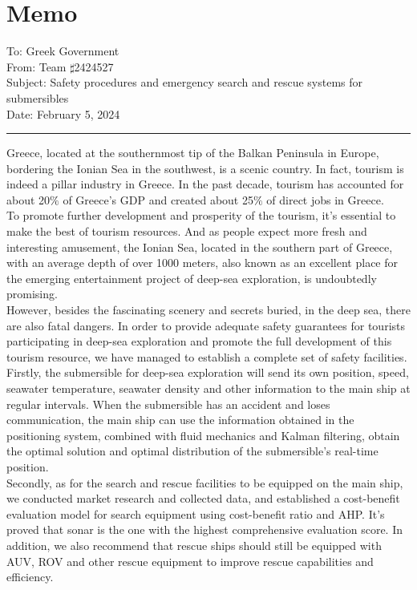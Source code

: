 \documentclass[12pt]{article}  %
\begin{document}
\clearpage 
\appendix %

\section{Memo}
\indent To: Greek Government\\
\indent From: Team $\sharp$2424527\\
\indent Subject: Safety procedures and emergency search and rescue systems for submersibles\\
\indent Date: February 5, 2024\\
\hrule
Greece, located at the southernmost tip of the Balkan Peninsula in Europe, bordering the Ionian Sea in the southwest, is a scenic country. In fact, tourism is indeed a pillar industry in Greece. In the past decade, tourism has accounted for about 20$\%$ of Greece's GDP and created about 25$\%$  of direct jobs in Greece.\\

To promote further development and prosperity of the tourism, it’s essential to make the best of tourism resources. And as people expect more fresh and interesting amusement, the Ionian Sea, located in the southern part of Greece, with an average depth of over 1000 meters, also known as an excellent place for the emerging entertainment project of deep-sea exploration, is undoubtedly promising.\\

However, besides the fascinating scenery and secrets buried, in the deep sea, there are also fatal dangers. In order to provide adequate safety guarantees for tourists participating in deep-sea exploration and promote the full development of this tourism resource, we have managed to establish a complete set of safety facilities.\\

Firstly, the submersible for deep-sea exploration will send its own position, speed, seawater temperature, seawater density and other information to the main ship at regular intervals. When the submersible has an accident and loses communication, the main ship can use the information obtained in the positioning system, combined with fluid mechanics and Kalman filtering, obtain the optimal solution and optimal distribution of the submersible's real-time position.\\

Secondly, as for the search and rescue facilities to be equipped on the main ship, we conducted market research and collected data, and established a cost-benefit evaluation model for search equipment using cost-benefit ratio and AHP. It’s proved that sonar is the one with the highest comprehensive evaluation score. In addition, we also recommend that rescue ships should still be equipped with AUV, ROV and other rescue equipment to improve rescue capabilities and efficiency.\\
\end{document}
